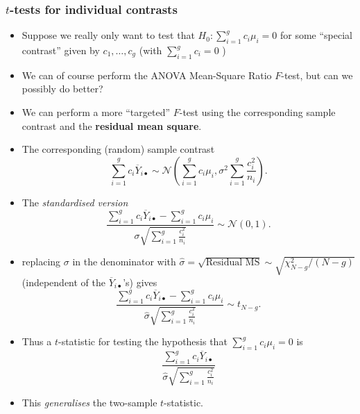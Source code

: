 \documentclass[a4paper]{article}\usepackage[]{graphicx}\usepackage[]{xcolor}
\begin{document}
\subsubsection{\( t \)-tests for individual contrasts}
\begin{itemize}
	\item Suppose we really only want to test that \( H_0: \sum_{i=1}^{g} c_i \mu_i = 0 \) for some ``special contrast'' given by \( c_1,\dotsc,c_g \) (with \( \sum_{i=1}^{g} c_i = 0 \) )
	\item We can of course perform the ANOVA Mean-Square Ratio \( F \)-test, but can we possibly do better?
	\item We can perform a more ``targeted'' \( F \)-test using the corresponding sample contrast and the \textcolor{mygreen}{\textbf{residual mean square}}.
	\item The corresponding (random) sample contrast
	\[
		\sum_{i=1}^gc_i\overline Y_{i\bullet}\sim \mathcal{N} \left(\sum_{i=1}^gc_i\mu_{i}, \sigma^2\sum_{i=1}^g \frac{c_i^2}{n_i}\right).
	\]
	\item The \textit{standardised version}
	\[
		\frac{\sum_{i=1}^gc_i\overline Y_{i\bullet}-\sum_{i=1}^gc_i\mu_i}{\sigma\sqrt{\sum_{i=1}^g \frac{c_i^2}{n_i}}} \sim \mathcal{N}(0,1).
	\]
	\item replacing \( \sigma \) in the denominator with \( \hat{\sigma} = \sqrt{\text{Residual MS}} \sim \sqrt{\chi^{2}_{N-g}/(N-g)} \) (independent of the \( \overline{Y}_{i\bullet} \)'s) gives
	\[
		\frac{\sum_{i=1}^gc_i\overline Y_{i\bullet}-\sum_{i=1}^gc_i\mu_i}{\hat\sigma\sqrt{\sum_{i=1}^g \frac{c_i^2}{n_i}}} \sim t_{N-g}.
	\]
	\item Thus a \( t \)-statistic for testing the hypothesis that \( \sum_{i=1}^{g} c_i \mu_i = 0 \) is
	\[
		\frac{\sum_{i=1}^gc_i\overline Y_{i\bullet}}{\hat\sigma\sqrt{\sum_{i=1}^g \frac{c_i^2}{n_i}}}
	\]
	\item This \textit{generalises} the two-sample \( t \)-statistic.
\end{itemize}
\end{document}
